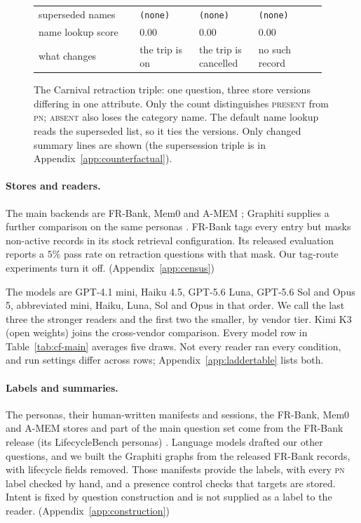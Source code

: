\documentclass{article}
\newcommand{\present}{\textsc{present}}
\newcommand{\absent}{\textsc{absent}}
\newcommand{\pn}{\textsc{pn}}
\begin{document}
\begin{figure}[t]
\begin{tabular}{@{}>{\raggedright\arraybackslash}p{0.34\linewidth}>{\raggedright\arraybackslash}p{0.20\linewidth}>{\raggedright\arraybackslash}p{0.20\linewidth}>{\raggedright\arraybackslash}p{0.23\linewidth}@{}}
superseded names & \texttt{(none)} & \texttt{(none)} & \texttt{(none)}\\
name lookup score & $0.00$ & $0.00$ & $0.00$\\
what changes & the trip is on & the trip is cancelled & no such record\\
\bottomrule
\end{tabular}
\caption{The Carnival retraction triple: one question, three store versions differing in one attribute. Only the count distinguishes \present{} from \pn{}; \absent{} also loses the category name. The default name lookup reads the superseded list, so it ties the versions. Only changed summary lines are shown (the supersession triple is in Appendix~\ref{app:counterfactual}).}
\label{fig:example}
\end{figure}
\paragraph{Stores and readers.}
The main backends are FR-Bank, Mem0 and A-MEM \citep{fr,mem0,amem}; Graphiti supplies a further comparison on the same personas \citep{zep}. FR-Bank tags every entry but masks non-active records in its stock retrieval configuration. Its released evaluation reports a $5\%$ pass rate on retraction questions with that mask. Our tag-route experiments turn it off. (Appendix~\ref{app:census})

The models are \mbox{GPT-4.1} mini, Haiku 4.5, \mbox{GPT-5.6} Luna, \mbox{GPT-5.6} Sol and Opus 5, abbreviated mini, Haiku, Luna, Sol and Opus in that order. We call the last three the stronger readers and the first two the smaller, by vendor tier. Kimi K3 (open weights) joins the cross-vendor comparison. Every model row in Table~\ref{tab:cf-main} averages five draws. Not every reader ran every condition, and run settings differ across rows; Appendix~\ref{app:laddertable} lists both.

\paragraph{Labels and summaries.}
The personas, their human-written manifests and sessions, the FR-Bank, Mem0 and A-MEM stores and part of the main question set come from the FR-Bank release (its LifecycleBench personas) \citep{fr}. Language models drafted our other questions, and we built the Graphiti graphs from the released FR-Bank records, with lifecycle fields removed. Those manifests provide the labels, with every \pn{} label checked by hand, and a presence control checks that targets are stored. Intent is fixed by question construction and is not supplied as a label to the reader. (Appendix~\ref{app:construction})
\end{document}
